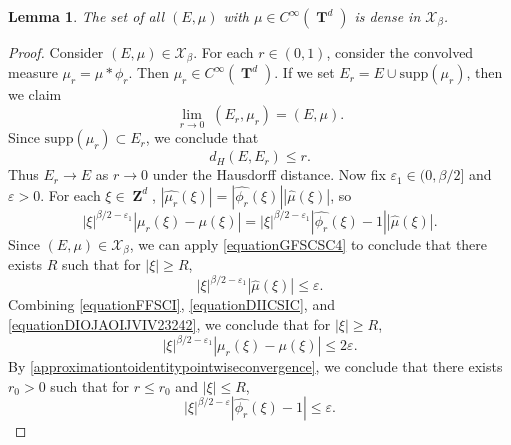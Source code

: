 \documentclass[12pt,reqno]{article}
\numberwithin{equation}{section}
\DeclareMathOperator{\ZZ}{\mathbf{Z}}
\DeclareMathOperator{\TT}{\mathbf{T}}
\newtheorem{lemma}{Lemma}
\begin{document}
\begin{lemma} \label{smoothdensitylemma}
    The set of all $(E,\mu)$ with $\mu \in C^\infty(\TT^d)$ is dense in $\mathcal{X}_\beta$.
\end{lemma}
\begin{proof}
    Consider $(E,\mu) \in \mathcal{X}_\beta$. For each $r \in (0,1)$, consider the convolved measure $\mu_r = \mu * \phi_r$. Then $\mu_r \in C^\infty(\TT^d)$. If we set $E_r = E \cup \text{supp}(\mu_r)$, then we claim
    \begin{equation} \label{equationFFSPCOS}
        \lim_{r \to 0}\; (E_r, \mu_r) = (E,\mu).
    \end{equation}
    Since $\text{supp}(\mu_r) \subset E_r$, we conclude that
    \begin{equation} \label{equationFFSICSI}
        d_H(E,E_r) \leq r.
    \end{equation}
    Thus $E_r \to E$ as $r \to 0$ under the Hausdorff distance. Now fix $\varepsilon_1 \in (0,\beta/2]$ and $\varepsilon > 0$. For each $\xi \in \ZZ^d$, $|\widehat{\mu_r}(\xi)| = |\widehat{\phi_r}(\xi)| |\widehat{\mu}(\xi)|$, so
    \begin{equation} \label{equationFFSCI}
        |\xi|^{\beta/2 - \varepsilon_1} |\mu_r(\xi) - \mu(\xi)| = |\xi|^{\beta/2 - \varepsilon_1} |\widehat{\phi_r}(\xi) - 1| |\widehat{\mu}(\xi)|.
    \end{equation}
    Since $(E,\mu) \in \mathcal{X}_\beta$, we can apply \eqref{equationGFSCSC4} to conclude that there exists $R$ such that for $|\xi| \geq R$,
    \begin{equation} \label{equationDIICSIC}
        |\xi|^{\beta/2 - \varepsilon_1} |\widehat{\mu}(\xi)| \leq \varepsilon.
    \end{equation}
    Combining \eqref{equationFFSCI}, \eqref{equationDIICSIC}, and \eqref{equationDIOJAOIJVIV23242}, we conclude that for $|\xi| \geq R$,
    \begin{equation} \label{equationDSCISIIXX}
        |\xi|^{\beta/2 - \varepsilon_1} |\mu_r(\xi) - \mu(\xi)| \leq 2 \varepsilon.
    \end{equation}
    By \eqref{approximationtoidentitypointwiseconvergence}, we conclude that there exists $r_0 > 0$ such that for $r \leq r_0$ and $|\xi| \leq R$,
    \begin{equation} \label{equationDISCIIS}
        |\xi|^{\beta/2 - \varepsilon} |\widehat{\phi_r}(\xi) - 1| \leq \varepsilon.
    \end{equation}

\end{proof}
\end{document}

